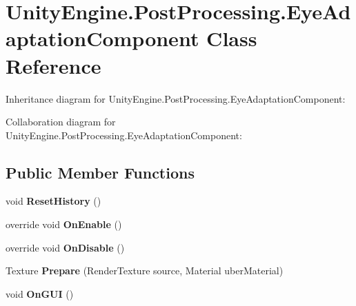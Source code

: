 \hypertarget{class_unity_engine_1_1_post_processing_1_1_eye_adaptation_component}{}\section{Unity\+Engine.\+Post\+Processing.\+Eye\+Adaptation\+Component Class Reference}
\label{class_unity_engine_1_1_post_processing_1_1_eye_adaptation_component}


Inheritance diagram for Unity\+Engine.\+Post\+Processing.\+Eye\+Adaptation\+Component\+:


Collaboration diagram for Unity\+Engine.\+Post\+Processing.\+Eye\+Adaptation\+Component\+:
\subsection*{Public Member Functions}
\begin{DoxyCompactItemize}
\item 
\mbox{\label{class_unity_engine_1_1_post_processing_1_1_eye_adaptation_component_a461fa3fb6ad4571e4d860ed8c7c0beb4}} 
void {\bfseries Reset\+History} ()
\item 
\mbox{\label{class_unity_engine_1_1_post_processing_1_1_eye_adaptation_component_a1fd3a905eb93bbb912e2316baa1b1396}} 
override void {\bfseries On\+Enable} ()
\item 
\mbox{\label{class_unity_engine_1_1_post_processing_1_1_eye_adaptation_component_a983236f00adbfa6c477423ecf2d55eec}} 
override void {\bfseries On\+Disable} ()
\item 
\mbox{\label{class_unity_engine_1_1_post_processing_1_1_eye_adaptation_component_af6319d4a0410aedaa227fe1725e70309}} 
Texture {\bfseries Prepare} (Render\+Texture source, Material uber\+Material)
\item 
\mbox{\label{class_unity_engine_1_1_post_processing_1_1_eye_adaptation_component_a3f25f90f406ea8d9ae4e51194c802a71}} 
void {\bfseries On\+G\+UI} ()
\end{DoxyCompactItemize}

